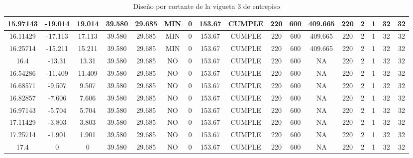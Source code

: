 \begin{table}[H]
{\begin{tabular}{|c|c|c|c|c|c|c|c|c|c|c|c|c|c|c|c|c|}
    \hline
    15.97143 & -19.014 & 19.014 & 39.580 & 29.685 & MIN & 0   & 153.67 & CUMPLE & 220 & 600 & 409.665 & 220 & 2   & 1   & 32  & 32 \bigstrut\\
    \hline
    16.11429 & -17.113 & 17.113 & 39.580 & 29.685 & MIN & 0   & 153.67 & CUMPLE & 220 & 600 & 409.665 & 220 & 2   & 1   & 32  & 32 \bigstrut\\
    \hline
    16.25714 & -15.211 & 15.211 & 39.580 & 29.685 & MIN & 0   & 153.67 & CUMPLE & 220 & 600 & 409.665 & 220 & 2   & 1   & 32  & 32 \bigstrut\\
    \hline
    16.4 & -13.31 & 13.31 & 39.580 & 29.685 & NO  & 0   & 153.67 & CUMPLE & 220 & 600 & NA  & 220 & 2   & 1   & 32  & 32 \bigstrut\\
    \hline
    16.54286 & -11.409 & 11.409 & 39.580 & 29.685 & NO  & 0   & 153.67 & CUMPLE & 220 & 600 & NA  & 220 & 2   & 1   & 32  & 32 \bigstrut\\
    \hline
    16.68571 & -9.507 & 9.507 & 39.580 & 29.685 & NO  & 0   & 153.67 & CUMPLE & 220 & 600 & NA  & 220 & 2   & 1   & 32  & 32 \bigstrut\\
    \hline
    16.82857 & -7.606 & 7.606 & 39.580 & 29.685 & NO  & 0   & 153.67 & CUMPLE & 220 & 600 & NA  & 220 & 2   & 1   & 32  & 32 \bigstrut\\
    \hline
    16.97143 & -5.704 & 5.704 & 39.580 & 29.685 & NO  & 0   & 153.67 & CUMPLE & 220 & 600 & NA  & 220 & 2   & 1   & 32  & 32 \bigstrut\\
    \hline
    17.11429 & -3.803 & 3.803 & 39.580 & 29.685 & NO  & 0   & 153.67 & CUMPLE & 220 & 600 & NA  & 220 & 2   & 1   & 32  & 32 \bigstrut\\
    \hline
    17.25714 & -1.901 & 1.901 & 39.580 & 29.685 & NO  & 0   & 153.67 & CUMPLE & 220 & 600 & NA  & 220 & 2   & 1   & 32  & 32 \bigstrut\\
    \hline
    17.4 & 0   & 0   & 39.580 & 29.685 & NO  & 0   & 153.67 & CUMPLE & 220 & 600 & NA  & 220 & 2   & 1   & 32  & 32 \bigstrut\\
    \hline
    
    
    \end{tabular}}%
    \caption{Diseño por cortante de la vigueta 3 de entrepiso}
  \label{tab:CORT VT3 EP}%
\end{table}%
